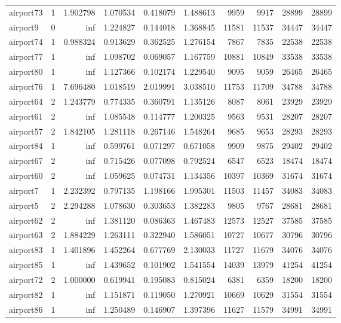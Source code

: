 \begin{longtable}{|l|r|r|r|r|r|r|r|r|r|}
airport73 & 1 & 1.902798 & 1.070534 & 0.418079 & 1.488613 & 9959 & 9917 & 28899 & 28899 \\
airport9 & 0 & inf & 1.224827 & 0.144018 & 1.368845 & 11581 & 11537 & 34447 & 34447 \\
airport74 & 1 & 0.988324 & 0.913629 & 0.362525 & 1.276154 & 7867 & 7835 & 22538 & 22538 \\
airport77 & 1 & inf & 1.098702 & 0.069057 & 1.167759 & 10881 & 10849 & 33538 & 33538 \\
airport80 & 1 & inf & 1.127366 & 0.102174 & 1.229540 & 9095 & 9059 & 26465 & 26465 \\
airport76 & 1 & 7.696480 & 1.018519 & 2.019991 & 3.038510 & 11753 & 11709 & 34788 & 34788 \\
airport64 & 2 & 1.243779 & 0.774335 & 0.360791 & 1.135126 & 8087 & 8061 & 23929 & 23929 \\
airport61 & 2 & inf & 1.085548 & 0.114777 & 1.200325 & 9563 & 9531 & 28207 & 28207 \\
airport57 & 2 & 1.842105 & 1.281118 & 0.267146 & 1.548264 & 9685 & 9653 & 28293 & 28293 \\
airport84 & 1 & inf & 0.599761 & 0.071297 & 0.671058 & 9909 & 9875 & 29402 & 29402 \\
airport67 & 2 & inf & 0.715426 & 0.077098 & 0.792524 & 6547 & 6523 & 18474 & 18474 \\
airport60 & 2 & inf & 1.059625 & 0.074731 & 1.134356 & 10397 & 10369 & 31674 & 31674 \\
airport7 & 1 & 2.232392 & 0.797135 & 1.198166 & 1.995301 & 11503 & 11457 & 34083 & 34083 \\
airport5 & 2 & 2.294288 & 1.078630 & 0.303653 & 1.382283 & 9805 & 9767 & 28681 & 28681 \\
airport62 & 2 & inf & 1.381120 & 0.086363 & 1.467483 & 12573 & 12527 & 37585 & 37585 \\
airport63 & 2 & 1.884229 & 1.263111 & 0.322940 & 1.586051 & 10727 & 10677 & 30796 & 30796 \\
airport83 & 1 & 1.401896 & 1.452264 & 0.677769 & 2.130033 & 11727 & 11679 & 34076 & 34076 \\
airport85 & 1 & inf & 1.439652 & 0.101902 & 1.541554 & 14039 & 13979 & 41254 & 41254 \\
airport72 & 2 & 1.000000 & 0.619941 & 0.195083 & 0.815024 & 6381 & 6359 & 18200 & 18200 \\
airport82 & 1 & inf & 1.151871 & 0.119050 & 1.270921 & 10669 & 10629 & 31554 & 31554 \\
airport86 & 1 & inf & 1.250489 & 0.146907 & 1.397396 & 11627 & 11579 & 34991 & 34991 \\

\end{longtable}
